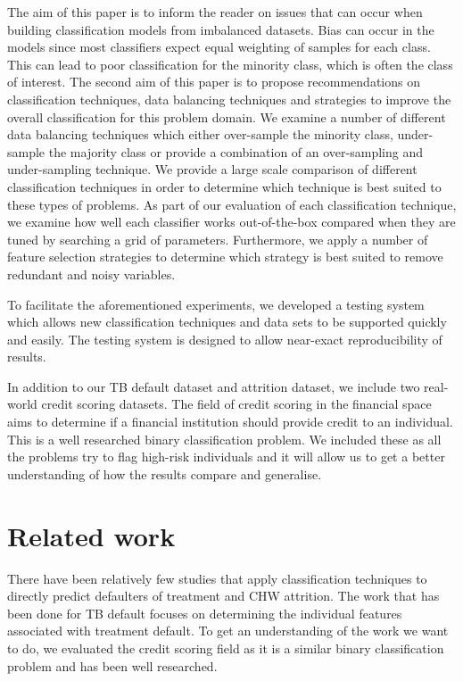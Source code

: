 \documentclass{sig-alternate-05-2015}
\begin{document}
	The aim of this paper is to inform the reader on issues that can occur when building classification models from imbalanced datasets. Bias can occur in the models since most classifiers expect equal weighting of samples for each class. This can lead to poor classification for the minority class, which is often the class of interest. The second aim of this paper is to propose recommendations on classification techniques, data balancing techniques and strategies to improve the overall classification for this problem domain. We examine a number of different data balancing techniques which either over-sample the minority class, under-sample the majority class or provide a combination of an over-sampling and under-sampling technique. We provide a large scale comparison of different classification techniques in order to determine which technique is best suited to these types of problems. As part of our evaluation of each classification technique, we examine how well each classifier works out-of-the-box compared when they are tuned by searching a grid of parameters. Furthermore, we apply a number of feature selection strategies to determine which strategy is best suited to remove redundant and noisy variables.
	
	To facilitate the aforementioned experiments, we developed a testing system which allows new classification techniques and data sets to be supported quickly and easily. The testing system is designed to allow near-exact reproducibility of results.
	
	In addition to our TB default dataset and attrition dataset, we include two real-world credit scoring datasets. The field of credit scoring in the financial space aims to determine if a financial institution should provide credit to an individual. This is a well researched binary classification problem. We included these as all the problems try to flag high-risk individuals and it will allow us to get a better understanding of how the results compare and generalise.
	
	\section{Related work}
	There have been relatively few studies that apply classification techniques to directly predict defaulters of treatment and CHW attrition. The work that has been done for TB default focuses on determining the individual features associated with treatment default. To get an understanding of the work we want to do, we evaluated the credit scoring field as it is a similar binary classification problem and has been well researched. 
\end{document}
